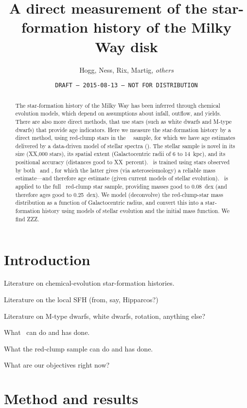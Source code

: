 \documentclass[12pt, preprint]{aastex}
\begin{document}
\title{A direct measurement of the star-formation history of the Milky Way disk}
\author{%
  Hogg,
  Ness,
  Rix,
  Martig,
  \emph{others}}
\date{\texttt{DRAFT --- 2015-08-13 --- NOT FOR DISTRIBUTION}}

\begin{abstract}
The star-formation history of the Milky Way has been inferred
through chemical evolution models, which depend on assumptions about
infall, outflow, and yields.
There are also more direct methods, that use stars (such as white
dwarfs and M-type dwarfs) that provide age indicators.
Here we measure the star-formation history by a direct method, using
red-clump stars in the \sdss\ \apogee\ sample, for which we have age
estimates delivered by a data-driven model of stellar spectra (\tc).
The stellar sample is novel in its size (XX,000 stars), its spatial
extent (Galactocentric radii of 6 to 14~kpc), and its positional
accuracy (distances good to XX~percent).
\tc\ is trained using stars observed by both \apogee\ and \kepler, for
which the latter gives (via asteroseismology) a reliable mass
estimate---and therefore age estimate (given current models of stellar
evolution).
\tc\ is applied to the full \apogee\ red-clump star sample, providing
masses good to 0.08~dex (and therefore ages good to 0.25~dex).
We model (deconvolve) the red-clump-star mass distribution as a function
of Galactocentric radius, and convert this into a star-formation history
using models of stellar evolution and the initial mass function.
We find ZZZ.
\end{abstract}

\section{Introduction}

Literature on chemical-evolution star-formation histories.

Literature on the local SFH (from, say, Hipparcos?)

Literature on M-type dwarfs, white dwarfs, rotation, anything else?

What \tc\ can do and has done.

What the red-clump sample can do and has done.

What are our objectives right now?

\section{Method and results}
\end{document}
